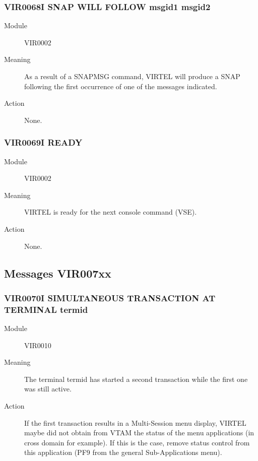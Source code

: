 \documentclass[letterpaper,10pt,english]{sphinxmanual}
\begin{document}
\subsubsection{VIR0068I SNAP WILL FOLLOW msgid1 msgid2}
\label{\detokenize{messages:vir0068i-snap-will-follow-msgid1-msgid2}}\begin{description}
\item[{Module}] \leavevmode
VIR0002

\item[{Meaning}] \leavevmode
As a result of a SNAPMSG command, VIRTEL will produce a SNAP following the first occurrence of one of the messages indicated.

\item[{Action}] \leavevmode
None.

\end{description}


\subsubsection{VIR0069I READY}
\label{\detokenize{messages:vir0069i-ready}}\begin{description}
\item[{Module}] \leavevmode
VIR0002

\item[{Meaning}] \leavevmode
VIRTEL is ready for the next console command (VSE).

\item[{Action}] \leavevmode
None.

\end{description}


\subsection{Messages VIR007xx}
\label{\detokenize{messages:messages-vir007xx}}

\subsubsection{VIR0070I SIMULTANEOUS TRANSACTION AT TERMINAL termid}
\label{\detokenize{messages:vir0070i-simultaneous-transaction-at-terminal-termid}}\begin{description}
\item[{Module}] \leavevmode
VIR0010

\item[{Meaning}] \leavevmode
The terminal termid has started a second transaction while the first one was still active.

\item[{Action}] \leavevmode
If the first transaction results in a Multi-Session menu display, VIRTEL maybe did not obtain from VTAM the status of the menu applications (in cross domain for example). If this is the case, remove status control from this application (PF9 from the general Sub-Applications menu).

\end{description}
\end{document}
